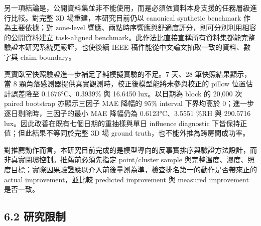 \documentclass[12pt,a4paper]{article}
\begin{document}
另一項結論是，公開資料集並非不能使用，而是必須依資料本身支援的任務層級進行比較。對完整 3D 場重建，本研究目前仍以 canonical synthetic benchmark 作為主要依據；對 zone-level 響應、兩點時序響應與舒適度評分，則可分別利用相容的公開資料建立 task-aligned benchmark。此作法比直接宣稱所有資料集都能完整驗證本研究系統更嚴謹，也使後續 IEEE 稿件能從中文論文抽取一致的資料、數字與 claim boundary。


真實臥室快照驗證進一步補足了純模擬實驗的不足。7 天、28 筆快照結果顯示，當 8 顆角落感測器提供真實觀測時，校正後模型能將未參與校正的 pillow 位置估計誤差降至 0.1676°C、0.3939\% 與 16.6450 lux。以日期為 block 的 20,000 次 paired bootstrap 亦顯示三因子 MAE 降幅的 95\% interval 下界均高於 0；進一步逐日剔除時，三因子的最小 MAE 降幅仍為 0.6123°C、3.5551 \%RH 與 290.5716 lux。因此改善在既有七個日期的重抽樣與單日 influence diagnostic 下皆保持正值；但此結果不等同於完整 3D 場 ground truth，也不能外推為跨房間成功率。


對推薦動作而言，本研究目前完成的是模型導向的反事實排序與驗證方法設計，而非真實閉環控制。推薦前必須先指定 point/cluster sample 與完整溫度、濕度、照度目標；實際因果驗證應以介入前後量測為準，檢查排名第一的動作是否帶來正的 actual improvement，並比較 predicted improvement 與 measured improvement 是否一致。


\subsection*{6.2 研究限制}
\end{document}
